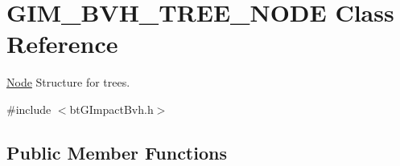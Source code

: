 \hypertarget{classGIM__BVH__TREE__NODE}{}\section{G\+I\+M\+\_\+\+B\+V\+H\+\_\+\+T\+R\+E\+E\+\_\+\+N\+O\+DE Class Reference}
\label{classGIM__BVH__TREE__NODE}


\hyperlink{classNode}{Node} Structure for trees.  




{\ttfamily \#include $<$bt\+G\+Impact\+Bvh.\+h$>$}

\subsection*{Public Member Functions}
